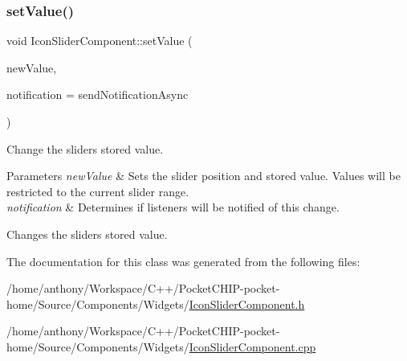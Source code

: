 \subsubsection{\texorpdfstring{set\+Value()}{setValue()}}
{\footnotesize\ttfamily void Icon\+Slider\+Component\+::set\+Value (\begin{DoxyParamCaption}\item[{double}]{new\+Value,  }\item[{Notification\+Type}]{notification = {\ttfamily sendNotificationAsync} }\end{DoxyParamCaption})}

Change the slider\textquotesingle{}s stored value.


\begin{DoxyParams}{Parameters}
{\em new\+Value} & Sets the slider position and stored value. Values will be restricted to the current slider range.\\
\hline
{\em notification} & Determines if listeners will be notified of this change.\\
\hline
\end{DoxyParams}
Changes the slider\textquotesingle{}s stored value. 

The documentation for this class was generated from the following files\+:\begin{DoxyCompactItemize}
\item 
/home/anthony/\+Workspace/\+C++/\+Pocket\+C\+H\+I\+P-\/pocket-\/home/\+Source/\+Components/\+Widgets/\mbox{\hyperlink{IconSliderComponent_8h}{Icon\+Slider\+Component.\+h}}\item 
/home/anthony/\+Workspace/\+C++/\+Pocket\+C\+H\+I\+P-\/pocket-\/home/\+Source/\+Components/\+Widgets/\mbox{\hyperlink{IconSliderComponent_8cpp}{Icon\+Slider\+Component.\+cpp}}\end{DoxyCompactItemize}
